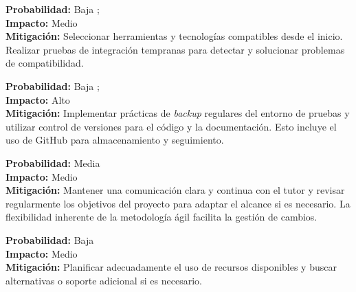 \begin{tcolorbox}[riskbox, title=Riesgo 4: Dificultades en la Implementación del \gls{dashboard}]
\textbf{Probabilidad:} Baja \baja; \\
\textbf{Impacto:} Medio \media\\
\textbf{Mitigación:} Seleccionar herramientas y tecnologías compatibles desde el inicio. Realizar pruebas de integración tempranas para detectar y solucionar problemas de compatibilidad.
\end{tcolorbox}

\begin{tcolorbox}[riskbox, title=Riesgo 5: Pérdida de Datos o Fallos en el Entorno de Pruebas]
\textbf{Probabilidad:} Baja \baja; \\
\textbf{Impacto:} Alto \alta\\
\textbf{Mitigación:} Implementar prácticas de \textit{backup} regulares del entorno de pruebas y utilizar control de versiones para el código y la documentación. Esto incluye el uso de GitHub para almacenamiento y seguimiento.
\end{tcolorbox}

\begin{tcolorbox}[riskbox, title=Riesgo 6: Cambios en los Requisitos o Alcance del Proyecto]
\textbf{Probabilidad:} Media \media\\
\textbf{Impacto:} Medio \media\\
\textbf{Mitigación:} Mantener una comunicación clara y continua con el tutor y revisar regularmente los objetivos del proyecto para adaptar el alcance si es necesario. La flexibilidad inherente de la metodología ágil facilita la gestión de cambios.
\end{tcolorbox}

\begin{tcolorbox}[riskbox, title=Riesgo 7: Acceso Limitado a  Recursos]
\textbf{Probabilidad:} Baja \baja\\
\textbf{Impacto:} Medio \media\\
\textbf{Mitigación:} Planificar adecuadamente el uso de recursos disponibles y buscar alternativas o soporte adicional si es necesario.
\end{tcolorbox}


